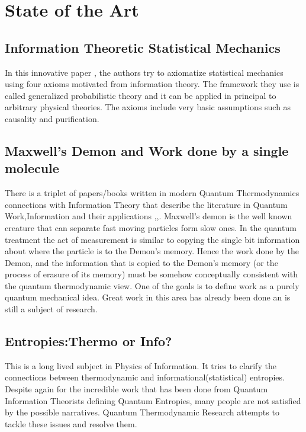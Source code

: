 \documentclass[a4paper,12pt]{article}
\begin{document}
\section{State of the Art}
\subsection*{Information Theoretic Statistical Mechanics}
In this innovative paper \cite{chiribella2016entanglement}, the authors try to axiomatize statistical mechanics using four axioms motivated from information theory. The framework they use is called generalized probabilistic theory and it can be applied in principal to arbitrary physical theories. The axioms include very basic assumptions such as causality and purification.
\subsection*{Maxwell's Demon and Work done by a single molecule}
There is a triplet of papers/books written in modern Quantum Thermodynamics connections with Information Theory that describe the literature in Quantum Work,Information and their applications \citep{deffner2019quantum},\citep{vinjanampathy2016quantum},\citep{goold2016role}. Maxwell's demon is the well known creature that can separate fast moving particles form slow ones. In the quantum treatment the act of measurement is similar to copying the single bit information
about where the particle is to the Demon’s memory. Hence the work done by the Demon, and the information that is copied to the Demon's memory (or the process of erasure of its memory) must be somehow conceptually consistent with the quantum thermodynamic view. One of the goals is to define work as a purely quantum mechanical idea. Great work in this area has already been done an is still a subject of research.
\subsection*{Entropies:Thermo or Info?}
This is a long lived subject in Physics of Information. It tries to clarify the connections between thermodynamic and informational(statistical) entropies. Despite again for the incredible work that has been done from Quantum Information Theorists defining Quantum Entropies, many people are not satisfied by the possible narratives. Quantum Thermodynamic Research attempts to tackle these issues and resolve them.
\end{document}
